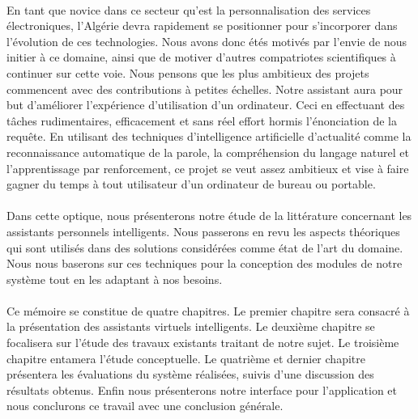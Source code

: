 \paragraph{}
En tant que novice dans ce secteur qu'est la personnalisation des services électroniques, l'Algérie devra rapidement se positionner pour s'incorporer dans l'évolution de ces technologies. Nous avons donc étés motivés par l'envie de nous initier à ce domaine, ainsi que de motiver d'autres compatriotes scientifiques à continuer sur cette voie. Nous pensons que les plus ambitieux des projets commencent avec des contributions à petites échelles. Notre assistant aura pour but d'améliorer l'expérience d'utilisation d'un ordinateur. Ceci en effectuant des tâches rudimentaires, efficacement et sans réel effort hormis l'énonciation de la requête. En utilisant des techniques d'intelligence artificielle d'actualité comme la reconnaissance automatique de la parole, la compréhension du langage naturel et l'apprentissage par renforcement, ce projet se veut assez ambitieux et vise à faire gagner du temps à tout utilisateur d'un ordinateur de bureau ou portable.
	
\paragraph{}
Dans cette optique, nous présenterons notre étude de la littérature concernant les assistants personnels intelligents. Nous passerons en revu les aspects théoriques qui sont utilisés dans des solutions considérées comme état de l'art du domaine. Nous nous baserons sur ces techniques pour la conception des modules de notre système tout en les adaptant à nos besoins. 

\paragraph{}
Ce mémoire se constitue de quatre chapitres. Le premier chapitre sera consacré à la présentation des assistants virtuels intelligents. Le deuxième chapitre se focalisera sur l'étude des travaux existants traitant de notre sujet. Le troisième chapitre entamera l'étude conceptuelle. Le quatrième et dernier chapitre présentera les évaluations du système réalisées, suivis d'une discussion des résultats obtenus. Enfin nous présenterons notre interface pour l'application et nous conclurons ce travail avec une conclusion générale.

